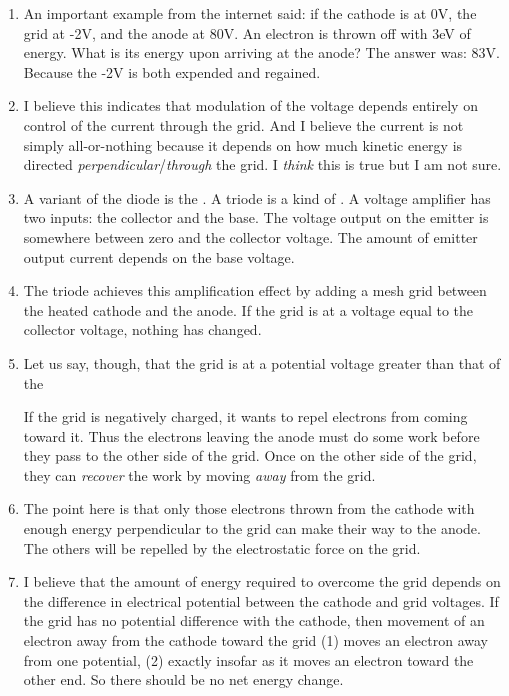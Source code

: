 \documentclass[11pt, oneside]{amsart}
\begin{document}
\begin{enumerate}
  \item An important example from the internet said: if the cathode is
  at 0V, the grid at -2V, and the anode at 80V. An electron is thrown
  off with 3eV of energy. What is its energy upon arriving at the anode?
  The answer was: 83V. Because the -2V is both expended and regained.

  \item I believe this indicates that modulation of the voltage depends
  entirely on control of the current through the grid. And I believe the
  current is not simply all-or-nothing because it depends on how much
  kinetic energy is directed \emph{perpendicular}/\emph{through} the
  grid. I \emph{think} this is true but I am not sure.

  \item A variant of the diode is the . A triode is a
  kind of . A voltage amplifier has two inputs: the
  collector and the base. The voltage output on the emitter is somewhere
  between zero and the collector voltage. The amount of emitter output
  current depends on the base voltage.

  \item The triode achieves this amplification effect by adding a mesh
  grid between the heated cathode and the anode. If the grid is at a
  voltage equal to the collector voltage, nothing has changed.

  \item Let us say, though, that the grid is at a potential voltage
  greater than that of the


  If the grid is
  negatively charged, it wants to repel electrons from coming toward it.
  Thus the electrons leaving the anode must do some work before they
  pass to the other side of the grid. Once on the other side of the
  grid, they can \emph{recover} the work by moving \emph{away} from the
  grid.

  \item The point here is that only those electrons thrown from the
  cathode with enough energy perpendicular to the grid can make their
  way to the anode. The others will be repelled by the electrostatic
  force on the grid.

  \item I believe that the amount of energy required to overcome the
  grid depends on the difference in electrical potential between the
  cathode and grid voltages. If the grid has no potential difference
  with the cathode, then movement of an electron away from the cathode
  toward the grid (1) moves an electron away from one potential, (2)
  exactly insofar as it moves an electron toward the other end. So there
  should be no net energy change.


\end{enumerate}
\end{document}
